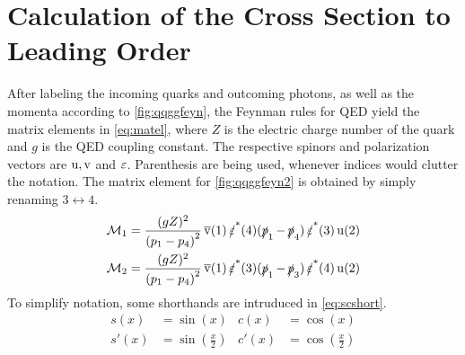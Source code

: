 \section{Calculation of the Cross Section to Leading Order}%
\label{sec:qqggcalc}

After labeling the incoming quarks and outcoming photons, as well as
the momenta according to \cref{fig:qqggfeyn}, the Feynman rules for
QED yield the matrix elements in \cref{eq:matel}, where \(Z\) is the
electric charge number of the quark and \(g\) is the QED coupling
constant. The respective spinors and polarization vectors are
\(\operatorname{u},\operatorname{v}\) and \(\operatorname{\varepsilon}\). Parenthesis are being used, whenever indices
would clutter the notation. The matrix element for
\cref{fig:qqggfeyn2} is obtained by simply renaming
\(3\leftrightarrow 4\).
%
\begin{align}
  \label{eq:matel}
  \mathcal{M}_1 &= \frac{(gZ)^2}{\qty(p_1 - p_4)^2}\vsb(1)\pses(4)(\ps_1 -
                \ps_4)\pses(3)\us(2)\\
  \mathcal{M}_2 &= \frac{(gZ)^2}{\qty(p_1 - p_4)^2}\vsb(1)\pses(3)(\ps_1 - \ps_3)\pses(4)\us(2)
\end{align}
%
To simplify notation, some shorthands are intruduced
in \cref{eq:scshort}.
\begin{equation}
  \label{eq:scshort}
  \begin{split}
    s(x) &= \sin(x) & c(x) &= \cos(x) \\ s'(x) &= \sin(\frac{x}{2}) & c'(x) &= \cos(\frac{x}{2})
  \end{split}
\end{equation}

